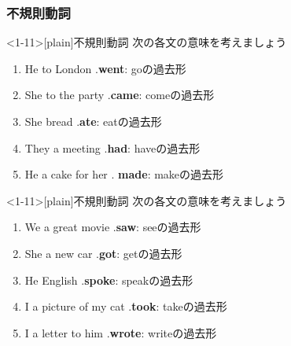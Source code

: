 \documentclass[aspectratio=169,xcolor={dvipsnames,table}]{beamer}
\newcommand{\myaudio}[1]{\href{#1}{\faVolumeUp}}
\begin{document}
\subsubsection{不規則動詞}
\begin{frame}<1-11>[plain]{不規則動詞}
 次の各文の意味を考えましょう

 \begin{enumerate}
  \item He  to London .\hfill{}{\small \textbf{went}: goの過去形}
  \item She  to the party .\hfill{}{\small \textbf{came}: comeの過去形}
  \item She  bread .\hfill{}{\small \textbf{ate}: eatの過去形}
  \item They  a meeting .\hfill{}{\small \textbf{had}: haveの過去形}
  \item He  a cake for her . \hfill{}{\small \textbf{made}: makeの過去形}
\end{enumerate}
\hfill\myaudio{./audio/025_past_do_11.mp3}

\end{frame}
\begin{frame}<1-11>[plain]{不規則動詞}
 次の各文の意味を考えましょう

 \begin{enumerate}%
   \item We   a great movie  .\hfill{}{\small \textbf{saw}: seeの過去形}
  \item She  a new car  .\hfill{}{\small \textbf{got}: getの過去形}
  \item He  English  .\hfill{}{\small \textbf{spoke}: speakの過去形}
  \item I  a picture of my cat  .\hfill{}{\small \textbf{took}: takeの過去形}
  \item I  a letter to him  .\hfill{}{\small \textbf{wrote}: writeの過去形}
\end{enumerate}
\hfill\myaudio{./audio/025_past_do_12.mp3}

\end{frame}
\end{document}

